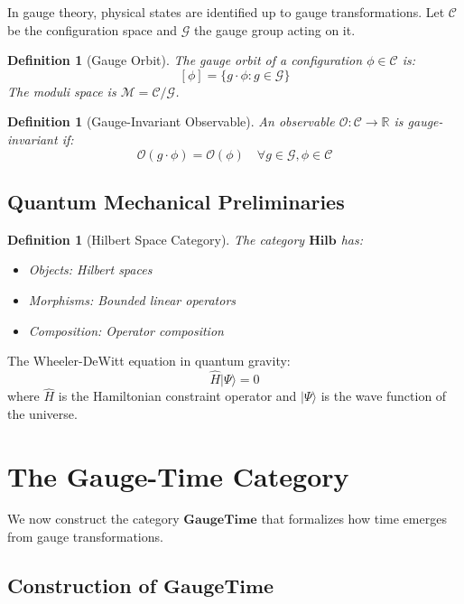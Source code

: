 \documentclass[12pt,a4paper]{article}
\newtheorem{definition}[theorem]{Definition}
\newcommand{\Cat}[1]{\mathbf{#1}}
\newcommand{\Hilb}{\Cat{Hilb}}
\newcommand{\GaugeGroup}{\mathcal{G}}
\newcommand{\Config}{\mathcal{C}}
\begin{document}
In gauge theory, physical states are identified up to gauge transformations. Let $\Config$ be the configuration space and $\GaugeGroup$ the gauge group acting on it.

\begin{definition}[Gauge Orbit]
The gauge orbit of a configuration $\phi \in \Config$ is:
\[
[\phi] = \{g \cdot \phi : g \in \GaugeGroup\}
\]
The moduli space is $\mathcal{M} = \Config/\GaugeGroup$.
\end{definition}

\begin{definition}[Gauge-Invariant Observable]
An observable $\mathcal{O}: \Config \to \mathbb{R}$ is gauge-invariant if:
\[
\mathcal{O}(g \cdot \phi) = \mathcal{O}(\phi) \quad \forall g \in \GaugeGroup, \phi \in \Config
\]
\end{definition}

\subsection{Quantum Mechanical Preliminaries}

\begin{definition}[Hilbert Space Category]
The category $\Hilb$ has:
\begin{itemize}
\item Objects: Hilbert spaces
\item Morphisms: Bounded linear operators
\item Composition: Operator composition
\end{itemize}
\end{definition}

The Wheeler-DeWitt equation in quantum gravity:
\[
\hat{H}|\Psi\rangle = 0
\]
where $\hat{H}$ is the Hamiltonian constraint operator and $|\Psi\rangle$ is the wave function of the universe.

\section{The Gauge-Time Category}

We now construct the category $\mathbf{GaugeTime}$ that formalizes how time emerges from gauge transformations.

\subsection{Construction of $\mathbf{GaugeTime}$}
\end{document}
